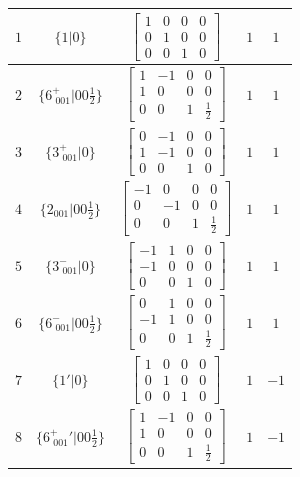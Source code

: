 \documentclass[fleqn,8pt]{jsarticle}
\begin{document}
\begin{longtable}{ccccc}
$ 1 $ & $ \{1|0\} $ & $ \begin{bmatrix} 1 & 0 & 0 & 0 \\ 0 & 1 & 0 & 0 \\ 0 & 0 & 1 & 0 \end{bmatrix} $ & $ 1 $ & $ 1 $ \\ \hline
$ 2 $ & $ \{6^{+}_{\,\,001}|0 0 \frac{1}{2}\} $ & $ \begin{bmatrix} 1 & -1 & 0 & 0 \\ 1 & 0 & 0 & 0 \\ 0 & 0 & 1 & \frac{1}{2} \end{bmatrix} $ & $ 1 $ & $ 1 $ \\ \hline
$ 3 $ & $ \{3^{+}_{\,\,001}|0\} $ & $ \begin{bmatrix} 0 & -1 & 0 & 0 \\ 1 & -1 & 0 & 0 \\ 0 & 0 & 1 & 0 \end{bmatrix} $ & $ 1 $ & $ 1 $ \\ \hline
$ 4 $ & $ \{2{}_{001}|0 0 \frac{1}{2}\} $ & $ \begin{bmatrix} -1 & 0 & 0 & 0 \\ 0 & -1 & 0 & 0 \\ 0 & 0 & 1 & \frac{1}{2} \end{bmatrix} $ & $ 1 $ & $ 1 $ \\ \hline
$ 5 $ & $ \{3^{-}_{\,\,001}|0\} $ & $ \begin{bmatrix} -1 & 1 & 0 & 0 \\ -1 & 0 & 0 & 0 \\ 0 & 0 & 1 & 0 \end{bmatrix} $ & $ 1 $ & $ 1 $ \\ \hline
$ 6 $ & $ \{6^{-}_{\,\,001}|0 0 \frac{1}{2}\} $ & $ \begin{bmatrix} 0 & 1 & 0 & 0 \\ -1 & 1 & 0 & 0 \\ 0 & 0 & 1 & \frac{1}{2} \end{bmatrix} $ & $ 1 $ & $ 1 $ \\ \hline
$ 7 $ & $ \{1{}'|0\} $ & $ \begin{bmatrix} 1 & 0 & 0 & 0 \\ 0 & 1 & 0 & 0 \\ 0 & 0 & 1 & 0 \end{bmatrix} $ & $ 1 $ & $ -1 $ \\ \hline
$ 8 $ & $ \{6^{+}_{\,\,001}{}'|0 0 \frac{1}{2}\} $ & $ \begin{bmatrix} 1 & -1 & 0 & 0 \\ 1 & 0 & 0 & 0 \\ 0 & 0 & 1 & \frac{1}{2} \end{bmatrix} $ & $ 1 $ & $ -1 $ \\ \hline

\end{longtable}
\end{document}
